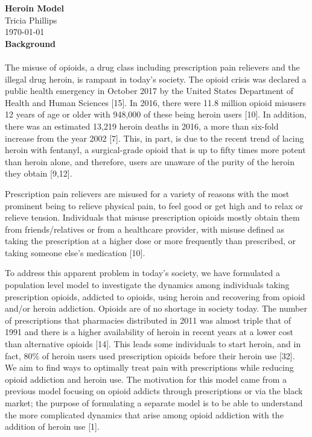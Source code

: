 \documentclass[12pt]{article}
\begin{document}
\textbf{Heroin Model} \\
Tricia Phillips \\
\today \\

\textbf{Background} \\ \\
The misuse of opioids, a drug class including prescription pain relievers and the illegal drug heroin, is rampant in today's society. The opioid crisis was declared a public health emergency in October 2017 by the United States Department of Health and Human Sciences [15]. In 2016, there were 11.8 million opioid misusers 12 years of age or older with 948,000 of these being heroin users [10]. In addition, there was an estimated 13,219 heroin deaths in 2016, a more than six-fold increase from the year 2002 [7]. This, in part, is due to the recent trend of lacing heroin with fentanyl, a surgical-grade opioid that is up to fifty times more potent than heroin alone, and therefore, users are unaware of the purity of the heroin they obtain [9,12]. 

Prescription pain relievers are misused for a variety of reasons with the most prominent being to relieve physical pain, to feel good or get high and to relax or relieve tension. Individuals that misuse prescription opioids mostly obtain them from friends/relatives or from a healthcare provider, with misuse defined as taking the prescription at a higher dose or more frequently than prescribed, or taking someone else's medication [10]. 

To address this apparent problem in today's society, we have formulated a population level model to investigate the dynamics among individuals taking prescription opioids, addicted to opioids, using heroin and recovering from opioid and/or heroin addiction. Opioids are of no shortage in society today. The number of prescriptions that pharmacies distributed in 2011 was almost triple that of 1991 and there is a higher availability of heroin in recent years at a lower cost than alternative opioids [14]. This leads some individuals to start heroin, and in fact, 80\% of heroin users used prescription opioids before their heroin use [32]. We aim to find ways to optimally treat pain with prescriptions while reducing opioid addiction and heroin use. The motivation for this model came from a previous model focusing on opioid addicts through prescriptions or via the black market; the purpose of formulating a separate model is to be able to understand the more complicated dynamics that arise among opioid addiction with the addition of heroin use [1].  
\end{document}
